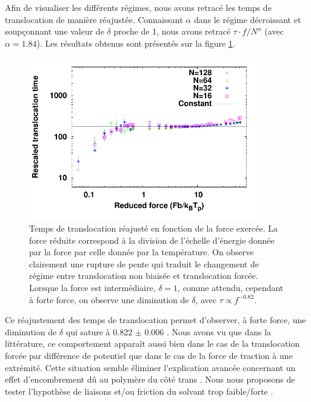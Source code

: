 \newpage


Afin de visualiser les différents régimes, nous avons retracé les temps de translocation de manière réajustée. Connaissant $\alpha$ dans le régime décroissant et soupçonnant une valeur de $\delta$ proche de 1, nous avons retracé $\tau \cdot f/N^{\alpha}$ (avec $\alpha=1.84$). Les résultats obtenus sont présentés sur la figure \ref{simplepolrescale}.


\begin{figure}[H]
\begin{center}
\includegraphics[width=0.9\textwidth]{transloctaufsimplepolresc.pdf}


\caption[Temps de translocations réajustés]{Temps de translocation réajusté en fonction de la force exercée. La force réduite correspond à la division de l'échelle d'énergie donnée par la force par celle donnée par la température. On observe clairement une rupture de pente qui traduit le changement de régime entre translocation non biaisée et translocation forcée. Lorsque la force est intermédiaire, $\delta=1$, comme attendu, cependant à forte force, on observe une diminution de $\delta$, avec $\tau \propto f^{-0.82}$.}
\label{simplepolrescale}
\end{center}
\end{figure}

Ce réajustement des temps de translocation permet d'observer, à forte force, une diminution de $\delta$ qui sature à 0.822 $\pm$ 0.006 . Nous avons vu que dans la littérature, ce comportement apparaît aussi bien dans le cas de la translocation forcée par différence de potentiel que dans le cas de la force de traction à une extrémité. Cette situation semble éliminer l'explication avancée concernant un effet d'encombrement dû au polymère du côté trans \cite{Palyulin2014}. Nous nous proposons de tester l'hypothèse de liaisons et/ou friction du solvant trop faible/forte \cite{2Ikonen2012}. 

